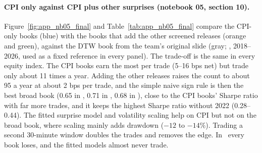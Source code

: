\paragraph{CPI only against CPI plus other surprises (notebook 05, section 10).}
Figure~\ref{fig:app_nb05_final} and Table~\ref{tab:app_nb05_final} compare the CPI-only books (blue)
with the books that add the other screened releases (orange and green), against the DTW book from
the team's original slide (gray; \ES, 2018--2026, used as a fixed reference in every panel). The
trade-off is the same in every equity index. The CPI books earn the most per trade (5--16 bps net)
but trade only about 11 times a year. Adding the other releases raises the count to about 95 a year
at about 2 bps per trade, and the simple naive sign rule is then the best broad book (0.65 in \ES,
0.71 in \NQ, 0.68 in \YM), close to the CPI books' Sharpe ratio with far more trades, and it keeps the
highest Sharpe ratio without 2022 (0.28--0.44). The fitted surprise model and volatility scaling
help on CPI but not on the broad book, where scaling mainly adds drawdown ($-12$ to $-14\%$).
Trading a second 30-minute window doubles the trades and removes the edge. In \ZN\ every book
loses, and the fitted models almost never trade.

